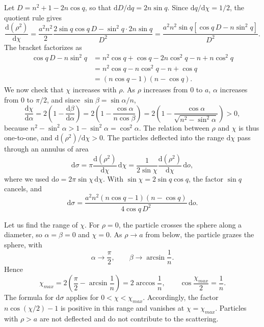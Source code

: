 \begin{problem}[title={Scattering by a spherical potential well}]
{\begin{equation*}
\end{equation*}
Let $D = n^2 + 1 - 2n\cos{q}$, so that $\mathrm{d}D/\mathrm{d}q = 2n\sin{q}$. Since $\mathrm{d}q/\mathrm{d}\chi = 1/2$, the quotient rule gives
\begin{equation*}
    \frac{\mathrm{d}(\rho^2)}{\mathrm{d}\chi} = \frac{a^2n^2}{2}\frac{2\sin{q}\cos{q}\,D - \sin^2{q}\cdot 2n\sin{q}}{D^2} = \frac{a^2n^2\sin{q}\left[ \cos{q}\,D - n\sin^2{q} \right]}{D^2}.
\end{equation*}
The bracket factorizes as
\begin{align*}
    \cos{q}\,D - n\sin^2{q} &= n^2\cos{q} + \cos{q} - 2n\cos^2{q} - n + n\cos^2{q} \\
    &= n^2\cos{q} - n\cos^2{q} - n + \cos{q} \\
    &= (n\cos{q} - 1)(n - \cos{q}).
\end{align*}
We now check that $\chi$ increases with $\rho$. As $\rho$ increases from $0$ to $a$, $\alpha$ increases from $0$ to $\pi/2$, and since $\sin{\beta} = \sin{\alpha}/n$,
\begin{equation*}
    \frac{\mathrm{d}\chi}{\mathrm{d}\alpha} = 2\left( 1 - \frac{\mathrm{d}\beta}{\mathrm{d}\alpha} \right) = 2\left( 1 - \frac{\cos{\alpha}}{n\cos{\beta}} \right) = 2\left( 1 - \frac{\cos{\alpha}}{\sqrt{n^2 - \sin^2{\alpha}}} \right) > 0,
\end{equation*}
because $n^2 - \sin^2{\alpha} > 1 - \sin^2{\alpha} = \cos^2{\alpha}$. The relation between $\rho$ and $\chi$ is thus one-to-one, and $\mathrm{d}(\rho^2)/\mathrm{d}\chi > 0$. The particles deflected into the range $\mathrm{d}\chi$ pass through an annulus of area
\begin{equation*}
    \mathrm{d}\sigma = \pi\frac{\mathrm{d}(\rho^2)}{\mathrm{d}\chi}\,\mathrm{d}\chi = \frac{1}{2\sin{\chi}}\frac{\mathrm{d}(\rho^2)}{\mathrm{d}\chi}\,\mathrm{d}o,
\end{equation*}
where we used $\mathrm{d}o = 2\pi\sin{\chi}\,\mathrm{d}\chi$. With $\sin{\chi} = 2\sin{q}\cos{q}$, the factor $\sin{q}$ cancels, and
\begin{equation*}
    \mathrm{d}\sigma = \frac{a^2n^2(n\cos{q} - 1)(n - \cos{q})}{4\cos{q}\,D^2}\,\mathrm{d}o.
\end{equation*}

Let us find the range of $\chi$. For $\rho = 0$, the particle crosses the sphere along a diameter, so $\alpha = \beta = 0$ and $\chi = 0$. As $\rho \to a$ from below, the particle grazes the sphere, with
\begin{equation*}
    \alpha \to \frac{\pi}{2}, \qquad \beta \to \arcsin{\frac{1}{n}}.
\end{equation*}
Hence
\begin{equation*}
    \chi_{max} = 2\left( \frac{\pi}{2} - \arcsin{\frac{1}{n}} \right) = 2\arccos{\frac{1}{n}}, \qquad \cos{\frac{\chi_{max}}{2}} = \frac{1}{n}.
\end{equation*}
The formula for $\mathrm{d}\sigma$ applies for $0 < \chi < \chi_{max}$. Accordingly, the factor $n\cos(\chi/2) - 1$ is positive in this range and vanishes at $\chi = \chi_{max}$. Particles with $\rho > a$ are not deflected and do not contribute to the scattering.

}
\end{problem}
